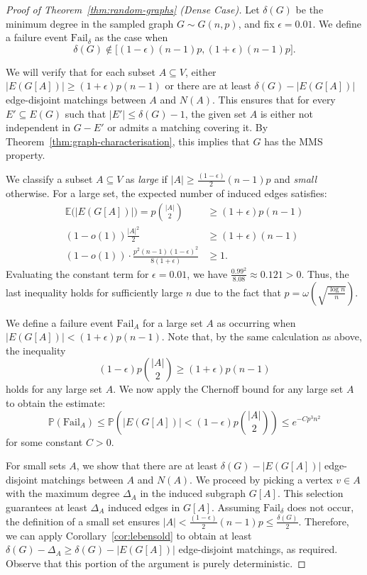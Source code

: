 \documentclass[12pt,UKenglish]{amsart}
\theoremstyle{plain}
\theoremstyle{definition}
\theoremstyle{remark}
\begin{document}
 \begin{proof}[Proof of Theorem~\ref{thm:random-graphs} (Dense Case)]
Let $\delta(G)$ be the minimum degree in the sampled graph $G\sim G(n,p)$, and fix $\epsilon = 0.01$. We define a failure event $\text{Fail}_\delta$ as the case when 
\[\delta(G) \notin \Big[ (1-\epsilon)(n-1)p, (1+\epsilon)(n-1)p \Big].\]

We will verify that for each subset $A\subseteq V$, either $|E(G[A])|\ge (1+\epsilon)p(n-1)$ or there are at least $\delta(G)-|E(G[A])|$ edge-disjoint matchings between $A$ and $N(A)$. This ensures that for every $E' \subseteq E(G)$ such that $|E'|\le\delta(G)-1$, the given set $A$ is either not independent in $G-E'$ or admits a matching covering it. By Theorem~\ref{thm:graph-characterisation}, this implies that $G$ has the MMS property.
 
We classify a subset $A\subseteq V$ as \textit{large} if $|A|\ge \frac{(1-\epsilon)}{2}(n-1)p$ and \textit{small} otherwise. For a large set, the expected number of induced edges satisfies: 
\begin{align*}
  \mathbb{E}\big(|E(G[A])|\big) = p\binom{|A|}{2} &\ge (1+\epsilon)p(n-1)\\
  (1-o(1))\frac{|A|^2}{2} &\ge (1+\epsilon)(n-1)\\
  (1-o(1))\cdot\frac{p^2(n-1)(1-\epsilon)^2}{8(1+\epsilon)} &\ge 1.
\end{align*}
Evaluating the constant term for $\epsilon = 0.01$, we have $\frac{0.99^2}{8.08} \approx 0.121 > 0$. Thus, the last inequality holds for sufficiently large $n$ due to the fact that $p=\omega\left(\sqrt{\frac{\log n}{n}}\right)$. 

We define a failure event $\text{Fail}_A$ for a large set $A$ as occurring when $|E(G[A])| < (1+\epsilon)p(n-1)$. Note that, by the same calculation as above, the inequality
\[(1-\epsilon)p\binom{|A|}{2} \ge (1+\epsilon)p(n-1)\] 
holds for any large set $A$. We now apply the Chernoff bound for any large set $A$ to obtain the estimate:
\[\mathbb{P}(\text{Fail}_A) \le \mathbb{P}\left(|E(G[A])| < (1-\epsilon)p\binom{|A|}{2}\right) \le e^{-Cp^3n^2}\]
for some constant $C>0$. 


For small sets $A$, we show that there are at least $\delta(G)-|E(G[A])|$ edge-disjoint matchings between $A$ and $N(A)$. We proceed by picking a vertex $v\in A$ with the maximum degree $\Delta_A$ in the induced subgraph $G[A]$. This selection guarantees at least $\Delta_A$ induced edges in $G[A]$. Assuming $\text{Fail}_\delta$ does not occur, the definition of a small set ensures $|A| < \frac{(1-\epsilon)}{2}(n-1)p \le \frac{\delta(G)}{2}$. Therefore, we can apply Corollary~\ref{cor:lebensold} to obtain at least $\delta(G)-\Delta_A \ge \delta(G)-|E(G[A])|$ edge-disjoint matchings, as required. Observe that this portion of the argument is purely deterministic. 


\end{proof}
\end{document}
